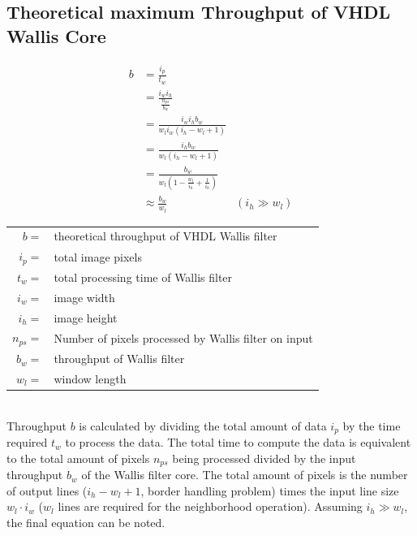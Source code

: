 \subsection{Theoretical maximum Throughput of VHDL Wallis Core} 
\label{app:derivations:theomaxvhdlwallis}

\begin{align}
    b  & = \frac{i_p}{t_w} &\\
       & = \frac{i_wi_h}{\frac{n_{ps}}{b_w}} &\\
       & = \frac{i_w i_h b_w}{w_l i_w (i_h-w_l+1)} &\\
       & = \frac{i_hb_w}{w_l (i_h-w_l+1)} &\\
       & = \frac{b_w}{w_l (1-\frac{w_l}{i_h}+\frac{1}{i_h})} &\\
       & \approx \frac{b_w}{w_l} &(i_h \gg w_l)
    \label{eq:theomaxvhdlwallis}
\end{align}
\begin{tabular}{rl}
    $b     =$ & theoretical throughput of VHDL Wallis filter \\
    $i_p   =$ & total image pixels \\
    $t_w   =$ & total processing time of Wallis filter \\
    $i_w   =$ & image width \\
    $i_h   =$ & image height \\
    $n_{ps}=$ & Number of pixels processed by Wallis filter on input \\
    $b_w   =$ & throughput of Wallis filter \\
    $w_l   =$ & window length \\
\end{tabular} \\

Throughput $b$ is calculated by dividing the total amount of data $i_p$ by the
time required $t_w$ to process the data. The total time to compute the data is
equivalent to the total amount of pixels $n_{ps}$ being processed divided by the
input throughput $b_w$ of the Wallis filter core. The total amount of pixels is
the number of output lines ($i_h-w_l+1$, border handling problem) times the
input line size $w_l \cdot i_w$ ($w_l$ lines are required for the neighborhood
operation). Assuming $i_h \gg w_l$, the final equation can be noted.
\clearpage